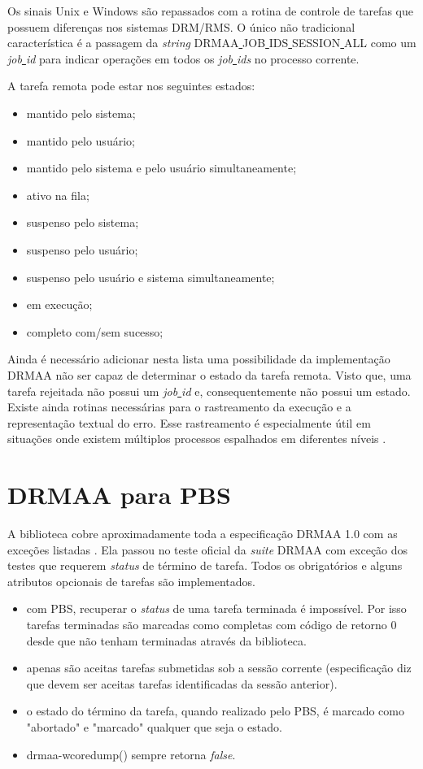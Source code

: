 Os sinais Unix e Windows são repassados com a rotina de controle de tarefas que possuem diferenças nos sistemas DRM/RMS. O único não tradicional característica é a passagem da \emph{string} DRMAA\underline{ }JOB\underline{ }IDS\underline{ }SESSION\underline{ }ALL como um \emph{job\underline{ }id} para indicar operações em todos os \emph{job\underline{ }ids} no processo corrente.

A tarefa remota pode estar nos seguintes estados:
\begin{itemize}
	\item mantido pelo sistema;
	\item mantido pelo usuário;
	\item mantido pelo sistema e pelo usuário simultaneamente;
	\item ativo na fila;
	\item suspenso pelo sistema;
	\item suspenso pelo usuário;
	\item suspenso pelo usuário e sistema simultaneamente;
	\item em execução;
	\item completo com/sem sucesso;
\end{itemize}

Ainda é necessário adicionar nesta lista uma possibilidade da implementação DRMAA não ser capaz de determinar o estado da tarefa remota. Visto que, uma tarefa rejeitada não possui um \emph{job\underline{ }id} e, consequentemente não possui um estado. Existe ainda rotinas necessárias para o rastreamento da execução e a representação textual do erro. Esse rastreamento é especialmente útil em situações onde existem múltiplos processos espalhados em diferentes níveis \cite{Rajic2002}.  

\section{DRMAA para PBS}

A biblioteca cobre aproximadamente toda a especificação DRMAA 1.0 com as exceções listadas \cite{drmaa_pbs}. Ela passou no teste oficial da \emph{suite} DRMAA com exceção dos testes que requerem \emph{status} de término de tarefa. Todos os obrigatórios e alguns atributos opcionais de tarefas são implementados.

\begin{itemize}
	\item com PBS, recuperar o \emph{status} de uma tarefa terminada é impossível. Por isso tarefas terminadas são marcadas como completas com código de retorno 0 desde que não tenham terminadas através da biblioteca.
	\item apenas são aceitas tarefas submetidas sob a sessão corrente (especificação diz que devem ser aceitas tarefas identificadas da sessão anterior).
	\item o estado do término da tarefa, quando realizado pelo PBS, é marcado como "abortado"  e  "marcado" qualquer que seja o estado.
	\item drmaa-wcoredump() sempre retorna \emph{false}.
\end{itemize}

